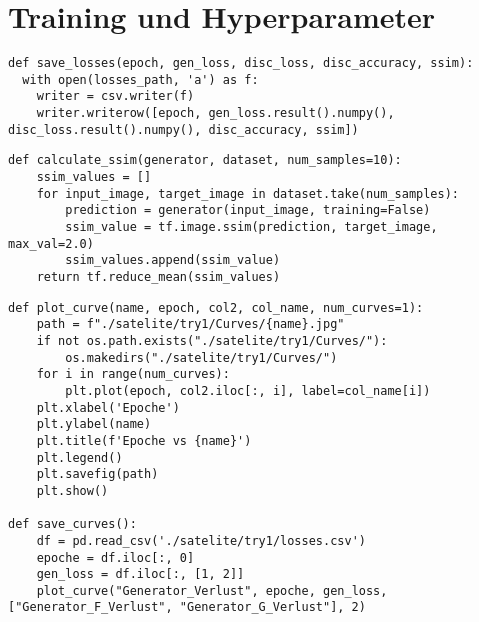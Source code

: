 \newpage

\newpage


\newpage
\section*{Training und Hyperparameter}
\begin{lstlisting}[language=pyhaff, caption={Speicherung der Metriken in CSV-Datei}, label={cod:csvSave}]
def save_losses(epoch, gen_loss, disc_loss, disc_accuracy, ssim):
  with open(losses_path, 'a') as f:
    writer = csv.writer(f)
    writer.writerow([epoch, gen_loss.result().numpy(), disc_loss.result().numpy(), disc_accuracy, ssim])
\end{lstlisting}

\begin{lstlisting}[language=pyhaff, caption={Berechnung des SSIM-Score}, label={cod:ssim}]
def calculate_ssim(generator, dataset, num_samples=10):
    ssim_values = []
    for input_image, target_image in dataset.take(num_samples):
        prediction = generator(input_image, training=False)
        ssim_value = tf.image.ssim(prediction, target_image, max_val=2.0)
        ssim_values.append(ssim_value)
    return tf.reduce_mean(ssim_values)
\end{lstlisting}

\newpage

\begin{lstlisting}[language=pyhaff, caption={Ausschnitt zur Erstellung einer Verlaufskurve (CycleGAN Implementierung)}, label={cod:curve}]
def plot_curve(name, epoch, col2, col_name, num_curves=1):
    path = f"./satelite/try1/Curves/{name}.jpg"
    if not os.path.exists("./satelite/try1/Curves/"):
        os.makedirs("./satelite/try1/Curves/")
    for i in range(num_curves):
        plt.plot(epoch, col2.iloc[:, i], label=col_name[i])
    plt.xlabel('Epoche')
    plt.ylabel(name)
    plt.title(f'Epoche vs {name}')
    plt.legend()
    plt.savefig(path)
    plt.show()

def save_curves():
    df = pd.read_csv('./satelite/try1/losses.csv')
    epoche = df.iloc[:, 0]
    gen_loss = df.iloc[:, [1, 2]]
    plot_curve("Generator_Verlust", epoche, gen_loss, ["Generator_F_Verlust", "Generator_G_Verlust"], 2)
\end{lstlisting}